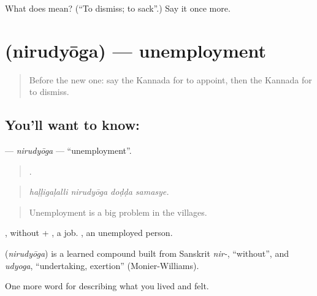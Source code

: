 \begin{tcolorbox}[breakable,colback=teal!4,colframe=teal!35!black,title={Before you move on}]
What does   mean? (\textquotedblleft{}To dismiss; to sack\textquotedblright{}.) Say it once more.
\end{tcolorbox}
\section[\texorpdfstring{\kn{ನಿರುದ್ಯೋಗ} (nirudyōga)}{ನಿರುದ್ಯೋಗ (nirudyōga)}]{ (nirudyōga) — unemployment}

\label{lesson:KA-C518-nirudyoga}



\begin{quote}
Before the new one: say the Kannada for to appoint, then the Kannada for to dismiss.
\end{quote}

\subsection*{You'll want to know: }
\textbf{} — \emph{nirudyōga} — \textquotedblleft{}unemployment\textquotedblright{}.

\begin{quote}
   .
\end{quote}

\begin{quote}
\emph{haḷḷigaḷalli nirudyōga doḍḍa samasye.}
\end{quote}

\begin{quote}
Unemployment is a big problem in the villages.
\end{quote}

, without + , a job. , an unemployed person.

\begin{cousinweb}
\textbf{} (\emph{nirudyōga}) is a learned compound built from Sanskrit \emph{nir-}, \textquotedblleft{}without\textquotedblright{}, and \emph{udyoga}, \textquotedblleft{}undertaking, exertion\textquotedblright{} (Monier-Williams).
\end{cousinweb}

\begin{grammarlens}[title={What you've built}]
One more word for describing what you lived and felt.
\end{grammarlens}

